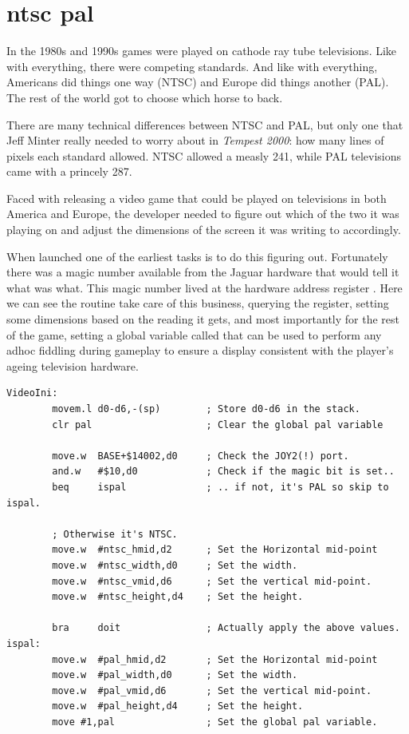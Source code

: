 \chapter{ntsc pal}
\label{sec:ntsc_pal}
\lstset{style=68KStyle}

In the 1980s and 1990s games were played on cathode ray tube televisions. Like
with everything, there were competing standards. And like with everything, Americans
did things one way (NTSC) and Europe did things another (PAL). The rest of the world
got to choose which horse to back.

There are many technical differences between NTSC and PAL, but only one that Jeff Minter
really needed to worry about in \textit{Tempest 2000}: how many lines of pixels each
standard allowed. NTSC allowed a measly 241, while PAL televisions came with a princely 287.

Faced with releasing a video game that could be played on televisions in both America and Europe, 
the developer needed to figure out which of the two it was playing on and adjust the dimensions
of the screen it was writing to accordingly.

When launched one of the earliest tasks is to do this figuring out. Fortunately there was a 
magic number available from the Jaguar hardware that would tell it what was what. This magic
number lived at the hardware address register . Here we can see the 
routine take care of this business, querying the register, setting some dimensions based on the
reading it gets, and most importantly for the rest of the game, setting a global variable called
 that can be used to perform any adhoc fiddling during gameplay to ensure a display
consistent with the player's ageing television hardware.

\begin{lstlisting}
VideoIni:
        movem.l d0-d6,-(sp)        ; Store d0-d6 in the stack.
        clr pal                    ; Clear the global pal variable
    
        move.w  BASE+$14002,d0     ; Check the JOY2(!) port.
        and.w   #$10,d0            ; Check if the magic bit is set..
        beq     ispal              ; .. if not, it's PAL so skip to ispal.
    
        ; Otherwise it's NTSC.
        move.w  #ntsc_hmid,d2      ; Set the Horizontal mid-point
        move.w  #ntsc_width,d0     ; Set the width.
        move.w  #ntsc_vmid,d6      ; Set the vertical mid-point.
        move.w  #ntsc_height,d4    ; Set the height.
    
        bra     doit               ; Actually apply the above values.
ispal:
        move.w  #pal_hmid,d2       ; Set the Horizontal mid-point
        move.w  #pal_width,d0      ; Set the width.
        move.w  #pal_vmid,d6       ; Set the vertical mid-point.
        move.w  #pal_height,d4     ; Set the height.
        move #1,pal                ; Set the global pal variable.
\end{lstlisting}


